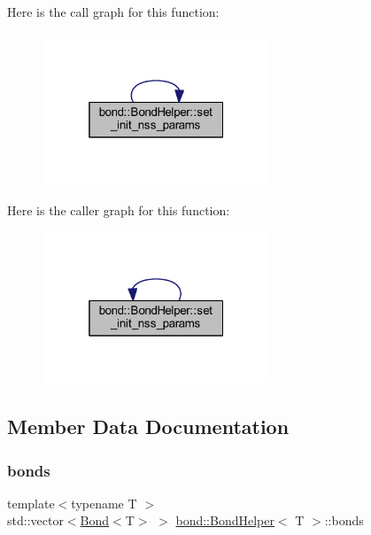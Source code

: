 Here is the call graph for this function\+:
\nopagebreak
\begin{figure}[H]
\begin{center}
\leavevmode
\includegraphics[width=193pt]{classbond_1_1_bond_helper_aaf31152498dbbf3704839a0c57e4555c_cgraph}
\end{center}
\end{figure}
Here is the caller graph for this function\+:
\nopagebreak
\begin{figure}[H]
\begin{center}
\leavevmode
\includegraphics[width=193pt]{classbond_1_1_bond_helper_aaf31152498dbbf3704839a0c57e4555c_icgraph}
\end{center}
\end{figure}


\subsection{Member Data Documentation}
\mbox{\label{classbond_1_1_bond_helper_a61db751f82d46ce2f7f5032ff2a3b03e}} 
\subsubsection{\texorpdfstring{bonds}{bonds}}
{\footnotesize\ttfamily template$<$typename T $>$ \\
std\+::vector$<$\hyperlink{classbond_1_1_bond}{Bond}$<$T$>$ $>$ \hyperlink{classbond_1_1_bond_helper}{bond\+::\+Bond\+Helper}$<$ T $>$\+::bonds\hspace{0.3cm}{\ttfamily [private]}}



